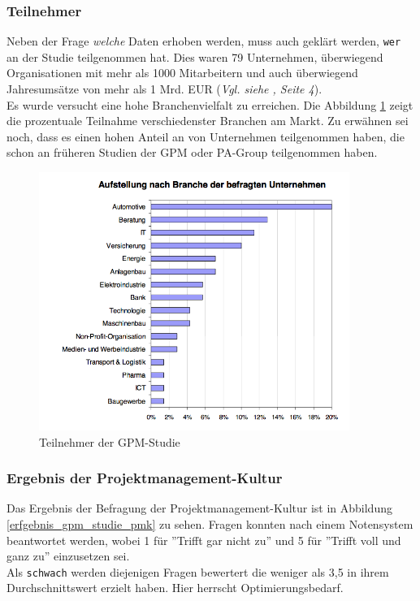 \documentclass[12pt]{scrartcl}
\begin{document}
\subsubsection{Teilnehmer}

Neben der Frage \textit{welche} Daten erhoben werden, muss auch geklärt werden, \texttt{wer} an der Studie teilgenommen hat. Dies waren 79 Unternehmen, überwiegend Organisationen mit mehr als 1000 Mitarbeitern und auch überwiegend Jahresumsätze von mehr als 1 Mrd. EUR (\textit{Vgl. siehe \cite{GPM_Studie_2008}, Seite 4}).\\
Es wurde versucht eine hohe Branchenvielfalt zu erreichen. Die Abbildung \ref{teilnehmer_gpm_studie} zeigt die prozentuale Teilnahme verschiedenster Branchen am Markt. Zu erwähnen sei noch, dass es einen hohen Anteil an von Unternehmen teilgenommen haben, die schon an früheren Studien der GPM oder PA-Group teilgenommen haben. 

\begin{figure}[H]
	\begin{center}
		\includegraphics[width=0.9\textwidth]{img/teilnehmer_gpm_studie}
		\caption{Teilnehmer der GPM-Studie}
		\label{teilnehmer_gpm_studie}	
	\end{center}
\end{figure}

\subsubsection{Ergebnis der Projektmanagement-Kultur}
\label{ergebnis_pmk}
Das Ergebnis der Befragung der Projektmanagement-Kultur ist in Abbildung \ref{erfgebnis_gpm_studie_pmk} zu sehen. Fragen konnten nach einem Notensystem beantwortet werden, wobei 1 für ''Trifft gar nicht zu'' und 5 für ''Trifft voll und ganz zu'' einzusetzen sei. \\
Als \texttt{schwach} werden diejenigen Fragen bewertert die weniger als 3,5 in ihrem Durchschnittswert erzielt haben. Hier herrscht Optimierungsbedarf. 
\end{document}
